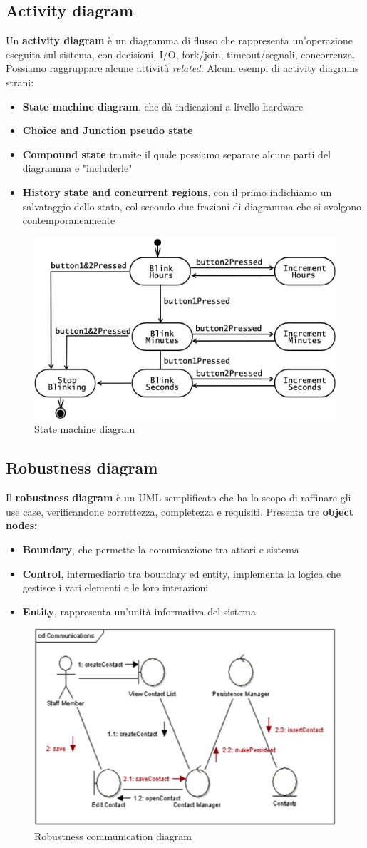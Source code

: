\documentclass[11pt]{article}
\begin{document}
\subsection{Activity diagram}
Un \textbf{activity diagram} è un diagramma di flusso che rappresenta un'operazione eseguita sul sistema, con decisioni, I/O, fork/join, timeout/segnali, concorrenza. Possiamo raggruppare alcune attività \textit{related}. 
Alcuni esempi di activity diagrams strani:
\begin{itemize}
    \item \textbf{State machine diagram}, che dà indicazioni a livello hardware
    \item \textbf{Choice and Junction pseudo state}
    \item \textbf{Compound state} tramite il quale possiamo separare alcune parti del diagramma e "includerle"
    \item \textbf{History state and concurrent regions}, con il primo indichiamo un salvataggio dello stato, col secondo due frazioni di diagramma che si svolgono contemporaneamente
\end{itemize}
\begin{figure}[H]
    \centering
    \includegraphics[width=0.6\linewidth]{res/teoria/StateMachine.png}
    \caption{State machine diagram}
\end{figure}
\subsection{Robustness diagram}
Il \textbf{robustness diagram} è un UML semplificato che ha lo scopo di raffinare gli use case, verificandone correttezza, completezza e requisiti.
Presenta tre \textbf{object nodes:}
\begin{itemize}
    \item \textbf{Boundary}, che permette la comunicazione tra attori e sistema
    \item \textbf{Control}, intermediario tra boundary ed entity, implementa la logica che gestisce i vari elementi e le loro interazioni
    \item \textbf{Entity}, rappresenta un'unità informativa del sistema
\end{itemize}
\begin{figure}[H]
    \centering
    \includegraphics[width=0.4\linewidth]{res/teoria/Robustness.png}
    \caption{Robustness communication diagram}
\end{figure}
\end{document}
